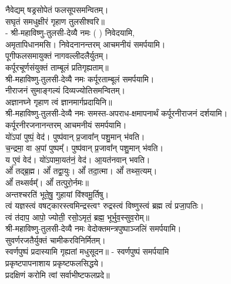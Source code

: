 नैवेद्यम् षड्रसोपेतं फलसूपसमन्वितम्।\\
सघृतं समधुक्षीरं गृहाण तुलसीश्वरि॥\\
- श्री-महाविष्णु-तुलसी-देव्यै नमः (	) निवेदयामि, \\
अमृतापिधानमसि। निवेदनानन्तरम् आचमनीयं समर्पयामि।\\

पूगीफलसमायुक्तं नागवल्लीदलैर्युतम्।\\
कर्पूरचूर्णसंयुक्तं ताम्बूलं प्रतिगृह्यताम्॥\\
श्री-महाविष्णु-तुलसी-देव्यै नमः कर्पूरताम्बूलं समर्पयामि।\\

नीराजनं सुमाङ्गल्यं दिव्यज्योतिसमन्वितम्।\\
अज्ञानघ्ने गृहाण त्वं ज्ञानमार्गप्रदायिनि॥\\
श्री-महाविष्णु-तुलसी-देव्यै नमः समस्त-अपराध-क्षमापनार्थं कर्पूरनीराजनं दर्शयामि।\\
कर्पूरनीरजनानन्तरम् आचमनीयं समर्पयामि।\\

यो॑ऽपां पुष्पं॒ वेद॑। पुष्प॑वान् प्र॒जावा᳚न् पशु॒मान् भ॑वति।\\
च॒न्द्रमा॒ वा अ॒पां पुष्पम्᳚। पुष्प॑वान् प्र॒जावा᳚न् पशु॒मान् भ॑वति।\\
य ए॒वं वेद॑। यो॑ऽपामा॒यत॑नं॒ वेद॑। आ॒यत॑नवान् भवति।\\

ओं᳚ तद्ब्र॒ह्म। ओं᳚ तद्वा॒युः। ओं᳚ तदा॒त्मा। ओं᳚ तथ्स॒त्यम्‌।\\
ओं᳚ तथ्सर्वम्᳚‌। ओं᳚ तत्पुरो॒र्नमः॥\\

अन्तश्चरति॑ भूते॒षु॒ गुहायां वि॑श्वमू॒र्तिषु। \\
त्वं यज्ञस्त्वं वषट्कारस्त्वमिन्द्रस्त्वꣳ रुद्रस्त्वं विष्णुस्त्वं ब्रह्म त्वं॑ प्रजा॒पतिः। \\
त्वं त॑दाप॒ आपो॒ ज्योती॒ रसो॒ऽमृतं॒ ब्रह्म॒ भूर्भुव॒स्सुव॒रोम्‌॥\\

श्री-महाविष्णु-तुलसी-देव्यै नमः वेदोक्तमन्त्रपुष्पाञ्जलिं समर्पयामि।\\

सुवर्णरजतैर्युक्तं चामीकरविनिर्मितम्।\\
स्वर्णपुष्पं प्रदास्यामि गृह्यतां मधुसूदन॥ - स्वर्णपुष्पं समर्पयामि\\

प्रकृष्टपापनाशाय प्रकृष्टफलसिद्धये।\\
प्रदक्षिणं करोमि त्वां सर्वाभीष्टफलप्रदे॥\\

